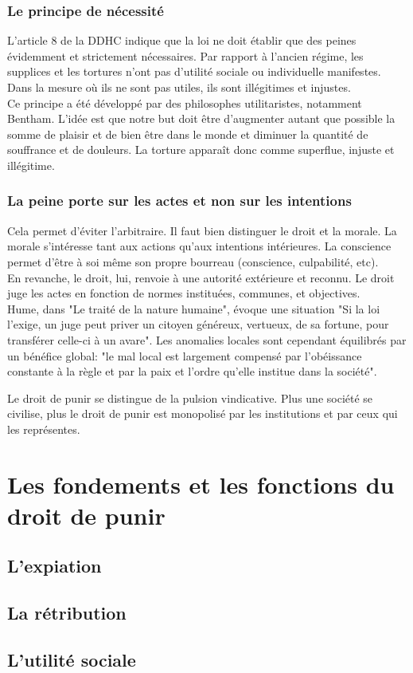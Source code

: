 \documentclass[10pt, a4paper, openany]{book}
\begin{document}
\subsubsection{Le principe de nécessité}

L'article 8 de la DDHC indique que la loi ne doit établir que des peines évidemment et strictement nécessaires. Par rapport à l'ancien régime, les supplices et les tortures n'ont pas d'utilité sociale ou individuelle manifestes. Dans la mesure où ils ne sont pas utiles, ils sont illégitimes et injustes. \\
Ce principe a été développé par des philosophes utilitaristes, notamment Bentham. L'idée est que notre but doit être d'augmenter autant que possible la somme de plaisir et de bien être dans le monde et diminuer la quantité de souffrance et de douleurs. La torture apparaît donc comme superflue, injuste et illégitime. 

\subsubsection{La peine porte sur les actes et non sur les intentions}

Cela permet d'éviter l'arbitraire. Il faut bien distinguer le droit et la morale. La morale s'intéresse tant aux actions qu'aux intentions intérieures. La conscience permet d'être à soi même son propre bourreau (conscience, culpabilité, etc). \\
En revanche, le droit, lui, renvoie à une autorité extérieure et reconnu. Le droit juge les actes en fonction de normes instituées, communes, et objectives. \\
Hume, dans "Le traité de la nature humaine", évoque une situation "Si la loi l'exige, un juge peut priver un citoyen généreux, vertueux, de sa fortune, pour transférer celle-ci à un avare". Les anomalies locales sont cependant équilibrés par un bénéfice global: "le mal local est largement compensé par l'obéissance constante à la règle et par la paix et l'ordre qu'elle institue dans la société". 


Le droit de punir se distingue de la pulsion vindicative. Plus une société se civilise, plus le droit de punir est monopolisé par les institutions et par ceux qui les représentes. 

\section{Les fondements et les fonctions du droit de punir}

\subsection{L'expiation}


\subsection{La rétribution}


\subsection{L'utilité sociale}
\end{document}
